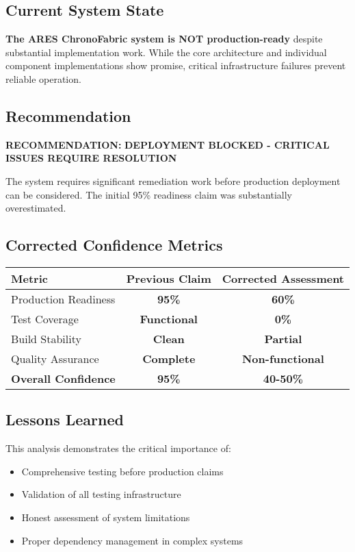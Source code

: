 \documentclass[11pt,a4paper]{article}
\newcommand{\critical}[1]{\textcolor{criticalred}{\textbf{#1}}}
\newcommand{\warning}[1]{\textcolor{warningorange}{\textbf{#1}}}
\newcommand{\success}[1]{\textcolor{successgreen}{\textbf{#1}}}
\begin{document}
\subsection{Current System State}

\critical{The ARES ChronoFabric system is NOT production-ready} despite substantial implementation work. While the core architecture and individual component implementations show promise, critical infrastructure failures prevent reliable operation.

\subsection{Recommendation}

\textbf{RECOMMENDATION:} \critical{DEPLOYMENT BLOCKED - CRITICAL ISSUES REQUIRE RESOLUTION}

The system requires significant remediation work before production deployment can be considered. The initial 95\% readiness claim was substantially overestimated.

\subsection{Corrected Confidence Metrics}

\begin{center}
\begin{tabular}{|l|c|c|}
\hline
\textbf{Metric} & \textbf{Previous Claim} & \textbf{Corrected Assessment} \\
\hline
Production Readiness & \success{95\%} & \warning{60\%} \\
Test Coverage & \success{Functional} & \critical{0\%} \\
Build Stability & \success{Clean} & \warning{Partial} \\
Quality Assurance & \success{Complete} & \critical{Non-functional} \\
\hline
\textbf{Overall Confidence} & \success{\textbf{95\%}} & \critical{\textbf{40-50\%}} \\
\hline
\end{tabular}
\end{center}

\subsection{Lessons Learned}

This analysis demonstrates the critical importance of:
\begin{itemize}
    \item Comprehensive testing before production claims
    \item Validation of all testing infrastructure
    \item Honest assessment of system limitations
    \item Proper dependency management in complex systems
\end{itemize}
\end{document}
